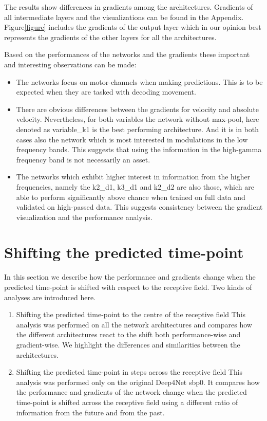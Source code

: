 The results show differences in gradients among the architectures.
Gradients of all intermediate layers and the visualizations can be found in the Appendix.
Figure\ref{figure} includes the gradients of the output layer which in our opinion best represents the gradients of the other layers for all the architectures.

Based on the performances of the networks and the gradients these important and interesting observations can be made:

\begin{itemize}
    \item The networks focus on motor-channels when making predictions.
This is to be expected when they are tasked with decoding movement.
    \item There are obvious differences between the gradients for velocity and absolute velocity.
    Nevertheless, for both variables the network without max-pool, here denoted as {variable}\_k1 is the best performing architecture.
    And it is in both cases also the network which is most interested in modulations in the low frequency bands.
    This suggests that using the information in the high-gamma frequency band is not necessarily an asset.
    \item The networks which exhibit higher interest in information from the higher frequencies, namely the k2\_d1, k3\_d1 and k2\_d2 are also those, which are able to perform significantly above chance when trained on full data and validated on high-passed data.
    This suggests consistency between the gradient visualization and the performance analysis.

\end{itemize}


\section{Shifting the predicted time-point}\label{sec:shifting-the-predicted-time-point}
In this section we describe how the performance and gradients change when the predicted time-point is shifted with respect to the receptive field.
Two kinds of analyses are introduced here.
\begin{enumerate}

    \item Shifting the predicted time-point to the centre of the receptive field
This analysis was performed on all the network architectures and compares how the different architectures react to the shift both performance-wise and gradient-wise.
We highlight the differences and similarities between the architectures.
    \item Shifting the predicted time-point in steps across the receptive field
This analysis was performed only on the original Deep4Net sbp0.
It compares how the performance and gradients of the network change when the predicted time-point is shifted across the receptive field using a different ratio of information from the future and from the past.
\end{enumerate}


